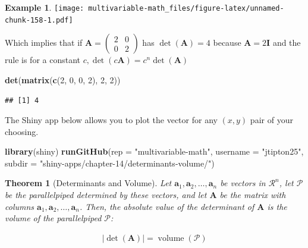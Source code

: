 \documentclass[
]{book}
\newenvironment{Shaded}{\begin{snugshade}}{\end{snugshade}}
\newcommand{\DataTypeTok}[1]{\textcolor[rgb]{0.13,0.29,0.53}{#1}}
\newcommand{\DecValTok}[1]{\textcolor[rgb]{0.00,0.00,0.81}{#1}}
\newcommand{\KeywordTok}[1]{\textcolor[rgb]{0.13,0.29,0.53}{\textbf{#1}}}
\newcommand{\NormalTok}[1]{#1}
\newcommand{\StringTok}[1]{\textcolor[rgb]{0.31,0.60,0.02}{#1}}
\newtheorem{theorem}{Theorem}[chapter]
\theoremstyle{definition}
\theoremstyle{definition}
\newtheorem{example}{Example}[chapter]
\theoremstyle{definition}
\theoremstyle{definition}
\theoremstyle{remark}
\begin{document}
\begin{example}
\texttt{[image: multivariable-math\_files/figure-latex/unnamed-chunk-158-1.pdf]}

Which implies that if \(\mathbf{A} = \begin{pmatrix} 2 & 0 \\ 0 & 2 \end{pmatrix}\) has \(\det(\mathbf{A}) = 4\) because \(\mathbf{A} = 2 \mathbf{I}\) and the rule is for a constant \(c, \det(c\mathbf{A}) = c^n \det(\mathbf{A})\)

\begin{Shaded}
\begin{Highlighting}[]
\KeywordTok{det}\NormalTok{(}\KeywordTok{matrix}\NormalTok{(}\KeywordTok{c}\NormalTok{(}\DecValTok{2}\NormalTok{, }\DecValTok{0}\NormalTok{, }\DecValTok{0}\NormalTok{, }\DecValTok{2}\NormalTok{), }\DecValTok{2}\NormalTok{, }\DecValTok{2}\NormalTok{))}
\end{Highlighting}
\end{Shaded}

\begin{verbatim}
## [1] 4
\end{verbatim}

\end{example}

The Shiny app below allows you to plot the vector for any \((x, y)\) pair of your choosing.

\begin{Shaded}
\begin{Highlighting}[]
\KeywordTok{library}\NormalTok{(shiny)}
\KeywordTok{runGitHub}\NormalTok{(}\DataTypeTok{rep =} \StringTok{"multivariable-math"}\NormalTok{,}
          \DataTypeTok{username =} \StringTok{"jtipton25"}\NormalTok{,}
          \DataTypeTok{subdir =} \StringTok{"shiny-apps/chapter-14/determinants-volume/"}\NormalTok{) }
\end{Highlighting}
\end{Shaded}

\begin{theorem}[Determinants and Volume]
Let \(\mathbf{a}_1, \mathbf{a}_2, \ldots, \mathbf{a}_n\) be vectors in \(\mathcal{R}^n\), let \(\mathcal{P}\) be the parallelpiped determined by these vectors, and let \(\mathbf{A}\) be the matrix with columns \(\mathbf{a}_1, \mathbf{a}_2, \ldots, \mathbf{a}_n\). Then, the absolute value of the determinant of \(\mathbf{A}\) is the volume of the parallelpiped \(\mathcal{P}\):

\[
\begin{aligned}
|\det(\mathbf{A})| = \operatorname{volume}(\mathcal{P})
\end{aligned}
\]
\end{theorem}
\end{document}
